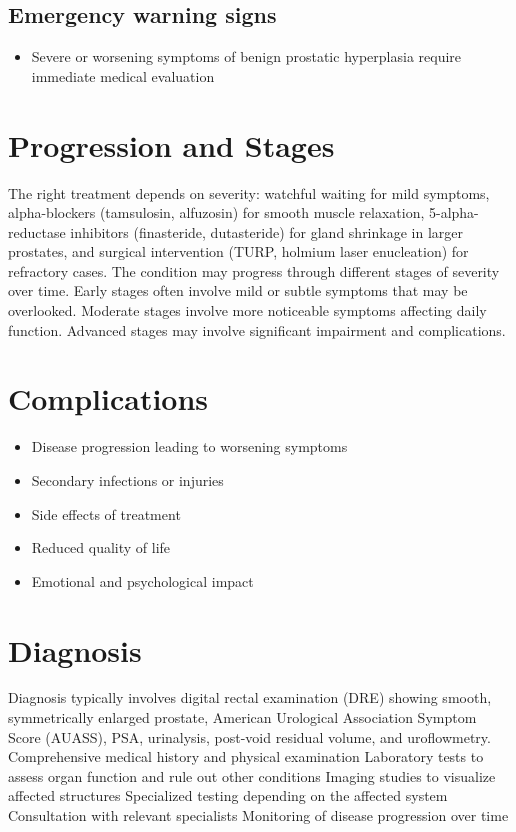 \subsection{Emergency warning signs}
\begin{itemize}[noitemsep]
  \item Severe or worsening symptoms of benign prostatic hyperplasia require immediate medical evaluation
\end{itemize}
\section{Progression and Stages}
The right treatment depends on severity: watchful waiting for mild symptoms, alpha-blockers (tamsulosin, alfuzosin) for smooth muscle relaxation, 5-alpha-reductase inhibitors (finasteride, dutasteride) for gland shrinkage in larger prostates, and surgical intervention (TURP, holmium laser enucleation) for refractory cases. The condition may progress through different stages of severity over time. Early stages often involve mild or subtle symptoms that may be overlooked. Moderate stages involve more noticeable symptoms affecting daily function. Advanced stages may involve significant impairment and complications.
\section{Complications}
\begin{itemize}[noitemsep]
  \item Disease progression leading to worsening symptoms
  \item Secondary infections or injuries
  \item Side effects of treatment
  \item Reduced quality of life
  \item Emotional and psychological impact
\end{itemize}
\section{Diagnosis}
Diagnosis typically involves digital rectal examination (DRE) showing smooth, symmetrically enlarged prostate, American Urological Association Symptom Score (AUASS), PSA, urinalysis, post-void residual volume, and uroflowmetry. Comprehensive medical history and physical examination Laboratory tests to assess organ function and rule out other conditions Imaging studies to visualize affected structures Specialized testing depending on the affected system Consultation with relevant specialists Monitoring of disease progression over time

